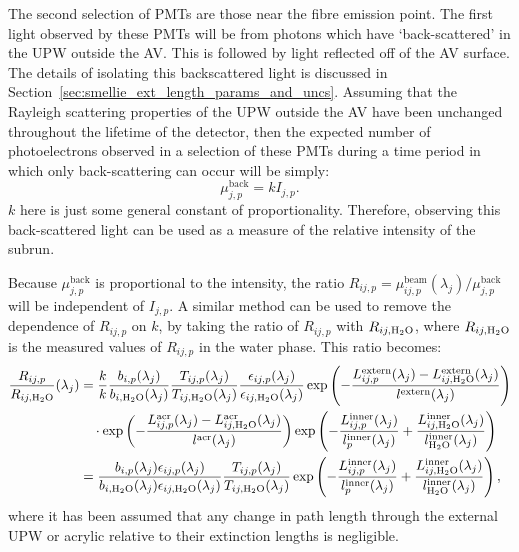 The second selection of PMTs are those near the fibre emission point. The first light observed by these PMTs will be from photons which have `back-scattered' in the UPW outside the AV. This is followed by light reflected off of the AV surface. The details of isolating this backscattered light is discussed in Section~\ref{sec:smellie_ext_length_params_and_uncs}. Assuming that the Rayleigh scattering properties of the UPW outside the AV have been unchanged throughout the lifetime of the detector, then the expected number of photoelectrons observed in a selection of these PMTs during a time period in which only back-scattering can occur will be simply:
\begin{equation}
    \mu_{j,p}^{\mathrm{back}} = kI_{j,p}.
\end{equation}
$k$ here is just some general constant of proportionality. Therefore, observing this back-scattered light can be used as a measure of the relative intensity of the subrun.

Because $\mu_{j,p}^{\mathrm{back}}$ is proportional to the intensity, the ratio $R_{ij,p} = \mu_{ij,p}^{\mathrm{beam}}(\lambda_{j})/\mu_{j,p}^{\mathrm{back}}$ will be independent of $I_{j,p}$. A similar method can be used to remove the dependence of $R_{ij,p}$ on $k$, by taking the ratio of $R_{ij,p}$ with $R_{ij,\ce{H_{2}O}}$, where $R_{ij,\ce{H_{2}O}}$ is the measured values of $R_{ij,p}$ in the water phase. This ratio becomes:
\begin{align}
    \frac{R_{ij,p}}{R_{ij,\ce{H_{2}O}}}(\lambda_{j}) 
    &= \frac{k}{k}
    \frac{b_{i,p}(\lambda_{j})}{b_{i,\ce{H_{2}O}}(\lambda_{j})}
    \frac{T_{ij,p}(\lambda_{j})}{T_{ij,\ce{H_{2}O}}(\lambda_{j})}
    \frac{\epsilon_{ij,p}(\lambda_{j})}{\epsilon_{ij,\ce{H_{2}O}}(\lambda_{j})}
    \exp\left(
        -\frac{L_{ij,p}^{\mathrm{extern}}(\lambda_{j})-L_{ij,\ce{H_{2}O}}^{\mathrm{extern}}(\lambda_{j})}{l^{\mathrm{extern}}(\lambda_{j})}
    \right)
    \nonumber\\
    & \quad \cdot \exp\left(
        -\frac{L_{ij,p}^{\mathrm{acr}}(\lambda_{j})-L_{ij,\ce{H_{2}O}}^{\mathrm{acr}}(\lambda_{j})}{l^{\mathrm{acr}}(\lambda_{j})}
    \right)
    \exp\left(
        -\frac{L_{ij,p}^{\mathrm{inner}}(\lambda_{j})}{l_{p}^{\mathrm{inner}}(\lambda_{j})}
        +\frac{L_{ij,\ce{H_{2}O}}^{\mathrm{inner}}(\lambda_{j})}{l_{\ce{H_{2}O}}^{\mathrm{inner}}(\lambda_{j})}
    \right)
    \nonumber\\
    &= \frac{b_{i,p}(\lambda_{j})\epsilon_{ij,p}(\lambda_{j})}{b_{i,\ce{H_{2}O}}(\lambda_{j})\epsilon_{ij,\ce{H_{2}O}}(\lambda_{j})}
    \frac{T_{ij,p}(\lambda_{j})}{T_{ij,\ce{H_{2}O}}(\lambda_{j})}
    \exp\left(
        -\frac{L_{ij,p}^{\mathrm{inner}}(\lambda_{j})}{l_{p}^{\mathrm{inner}}(\lambda_{j})}
        +\frac{L_{ij,\ce{H_{2}O}}^{\mathrm{inner}}(\lambda_{j})}{l_{\ce{H_{2}O}}^{\mathrm{inner}}(\lambda_{j})}
    \right),
\end{align}
where it has been assumed that any change in path length through the external UPW or acrylic relative to their extinction lengths is negligible.

